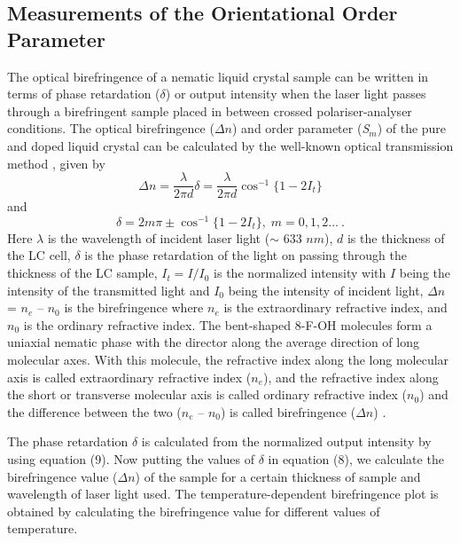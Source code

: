 \documentclass[reprint,amsfonts,amsmath,amssymb,aps,pre,floatfix,10pt]{revtex4-1}
\begin{document}
\subsection{Measurements of the Orientational Order Parameter}

The optical birefringence of a nematic liquid crystal sample can be written in terms of phase retardation ($\delta$) or output intensity when the laser light passes through a birefringent sample placed in between crossed polariser-analyser conditions. The optical birefringence ($\Delta n$) and order parameter (\emph{S$_{m}$}) of the pure and doped liquid crystal can be calculated by the well-known optical transmission method \cite{dierking2003textures_56}, given by
\begin{equation}
\label{Birefringence}
\Delta n = \frac{\lambda}{2\pi d}\delta %
= \frac{\lambda}{2\pi d}\cos ^{-1}\big\{1-2I_{t}\big\}
\end{equation}
and
\begin{equation}
\label{Phase retardation}
\delta = 2m\pi \pm \cos ^{-1}\big\{1-2I_{t}\big\},\;  m = 0, 1, 2... \ .
\end{equation}
Here $\lambda$ is the wavelength of incident laser light ($\sim$ 633  $nm$), $d$ is the thickness of the LC cell, $\delta$ is the phase retardation of the light on passing through the thickness of the LC sample, $I_{t} = I / I_0$ is the normalized intensity with $I$ being the intensity of the transmitted light and $I_{0}$ being the intensity of incident light, $\Delta n$ = $n_{e}$ – $n_{0}$ is the birefringence where $n_{e}$ is the extraordinary refractive index, and $n_{0}$ is the ordinary refractive index. The bent-shaped 8-F-OH molecules form a uniaxial nematic phase with the director along the average direction of long molecular axes. With this molecule, the refractive index along the long molecular axis is called extraordinary refractive index ($n_{e}$), and the refractive index along the short or transverse molecular axis is called ordinary refractive index ($n_{0}$) and the difference between the two ($n_{e}$ – $n_{0}$) is called birefringence ($\Delta n$) \cite{dierking2003textures_56}.

The phase retardation $\delta$ is calculated from the normalized output intensity by using equation (9). Now putting the values of $\delta$ in equation (8), we calculate the birefringence value ($\Delta n$) of the sample for a certain thickness of sample and wavelength of laser light used. The temperature-dependent birefringence plot is obtained by calculating the birefringence value for different values of temperature. 
\end{document}
